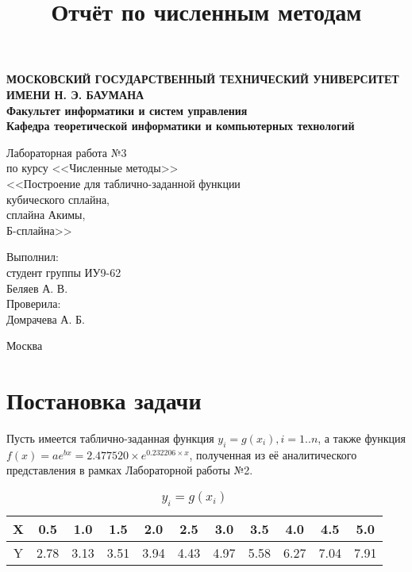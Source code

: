 \documentclass[12pt]{article}
\title{Отчёт по численным методам}
\date{}
\author{}
\begin{document}
    \newpage
    {
        \thispagestyle{empty}
        \centering
        
        \textbf{
        МОСКОВСКИЙ ГОСУДАРСТВЕННЫЙ ТЕХНИЧЕСКИЙ УНИВЕРСИТЕТ ИМЕНИ Н. Э. БАУМАНА \\
        Факультет информатики и систем управления \\
        Кафедра теоретической информатики и компьютерных технологий}
        \bigskip
        \bigskip
        \bigskip
        \bigskip
        \bigskip
        \bigskip
        \bigskip

        \vfill

        {\large Лабораторная работа №3}\\
        по курсу <<Численные методы>>\\
	\LARGE{<<Построение для таблично-заданной функции \\
			кубического сплайна,\\ 
			сплайна Акимы, \\
			Б-сплайна>>\\ }
	\normalsize

        \bigskip
        \vfill
        \hfill\parbox{5cm} {
            Выполнил:\\
            студент группы ИУ9-62 \hfill \\
            Беляев А. В.\hfill \medskip\\
            Проверила:\\
            Домрачева А. Б.\hfill
        }
        \vspace{\fill}

        
        Москва \number\year
        \clearpage
    }
	\newpage
	{
		\tableofcontents
		\clearpage
	}
    {
        \section{Постановка задачи}
    }
	
	Пусть имеется таблично-заданная функция $y_i=g(x_i), i=1..n$, а также функция $f(x)=ae^{bx}=2.477520 \times e^{0.232206 \times x}$, полученная из её аналитического представления в рамках Лабораторной работы №2.
	
	\begin{table}[h!]
\caption{$y_i = g(x_i)$ \label{table:one}}

\begin{center}
 \begin{tabular}{|c|c|c|c|c|c|c|c|c|c|c|} 
 \hline
X & 0.5 & 1.0& 1.5& 2.0& 2.5& 3.0& 3.5& 4.0& 4.5& 5.0\\
\hline
Y & 2.78& 3.13& 3.51& 3.94& 4.43& 4.97& 5.58& 6.27& 7.04& 7.91\\
\hline
\end{tabular}
\end{center}
\end{table}
\end{document}
